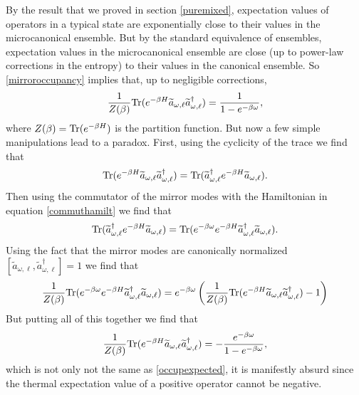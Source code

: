 \documentclass[12pt]{article}
\newcommand{\cop}[1]{#1}
\def\ta{\widetilde{\cop{a}}}
\def\tr{{\rm Tr}}
\newcommand{\be}{\begin{equation}}
\newcommand{\ee}{\end{equation}}
\begin{document}
By the result that we proved in section \ref{puremixed}, expectation values of operators in a typical state are exponentially close to their values in the microcanonical ensemble. But by the standard equivalence of ensembles,
expectation values in the microcanonical ensemble are close (up to power-law corrections in the entropy) to their values in the canonical ensemble. So \eqref{mirroroccupancy} implies that, up to negligible corrections,
\be
\label{occupexpected}
{1 \over Z(\beta)}\tr(e^{-\beta H} \ta_{\omega, \ell} \ta_{\omega, \ell}^{\dagger}) = {1 \over 1 - e^{-\beta \omega}},
\ee
where $Z(\beta) = \tr(e^{-\beta H})$ is the partition function.
But now a few simple manipulations lead to a paradox. First, using the cyclicity of the trace we find that
\be
\label{occupcyclicity}
\tr(e^{-\beta H} \ta_{\omega, \ell} \ta_{\omega, \ell}^{\dagger}) = \tr(\ta_{\omega, \ell}^{\dagger} e^{-\beta H} \ta_{\omega, \ell}).
\ee
Then using the commutator of the mirror modes with the Hamiltonian in equation \eqref{commuthamilt} we find that
\be
\tr(\ta_{\omega, \ell}^{\dagger} e^{-\beta H} \ta_{\omega, \ell}) = \tr( e^{-{\beta \omega}} e^{-\beta H} \ta_{\omega, \ell}^{\dagger} \ta_{\omega, \ell}).
\ee
Using the fact that the mirror modes are canonically normalized $[\ta_{\omega, \ell}, \ta_{\omega, \ell}^{\dagger}] = 1$ we find that
\be
{1 \over Z(\beta)} \tr( e^{-{\beta \omega}} e^{-\beta H} \ta_{\omega, \ell}^{\dagger} \ta_{\omega, \ell}) = e^{-{\beta \omega}} \left({1 \over Z(\beta)}\tr(e^{-\beta H} \ta_{\omega, \ell} \ta_{\omega, \ell}^{\dagger}) - 1 \right)
\ee
But putting all of this together we find that
\be
{1 \over Z(\beta)}\tr(e^{-\beta H} \ta_{\omega, \ell} \ta_{\omega, \ell}^{\dagger}) = -{e^{-{\beta \omega}}  \over 1 - e^{-\beta \omega}},
\ee
which is not only not the same as \eqref{occupexpected}, it is manifestly absurd since the thermal expectation value of a positive operator cannot be negative.
\end{document}
